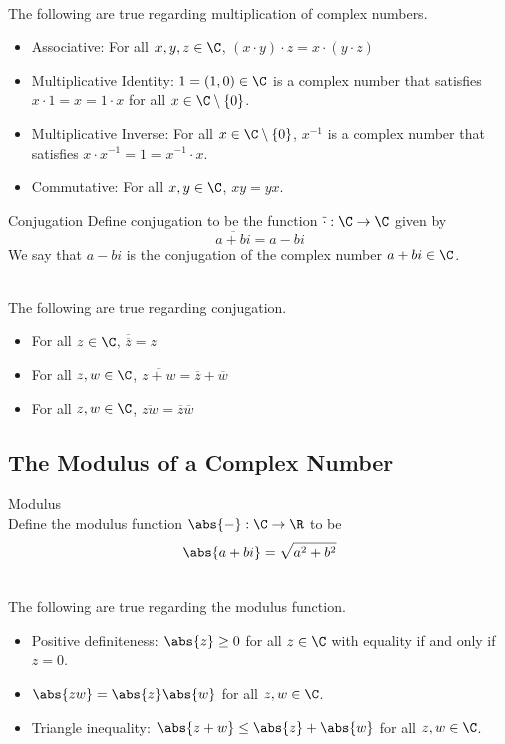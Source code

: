 \documentclass[a4paper]{article}
\begin{document}
\begin{prp}{}{}\\
The following are true regarding multiplication of complex numbers. 
\begin{itemize}
\item Associative: For all $x,y,z\in\C$, $(x\cdot y)\cdot z=x\cdot(y\cdot z)$
\item Multiplicative Identity: $1=(1,0)\in\C$ is a complex number that satisfies $x\cdot 1=x=1\cdot x$ for all $x\in\C\setminus\{0\}$. 
\item Multiplicative Inverse: For all $x\in\C\setminus\{0\}$, $x^{-1}$ is a complex number that satisfies $x\cdot x^{-1}=1=x^{-1}\cdot x$. 
\item Commutative: For all $x,y\in\C$, $xy=yx$. 
\end{itemize}
\end{prp}

\begin{defn}{Conjugation}{} Define conjugation to be the function $\overline{\cdot}:\C\to\C$ given by $$\overline{a+bi}=a-bi$$ We say that $a-bi$ is the conjugation of the complex number $a+bi\in\C$. 
\end{defn}

\begin{prp}{}{}\\
The following are true regarding conjugation. 
\begin{itemize}
\item For all $z\in\C$, $\overline{\overline{z}}=z$
\item For all $z,w\in\C$, $\overline{z+w}=\overline{z}+\overline{w}$
\item For all $z,w\in\C$, $\overline{zw}=\overline{z}\overline{w}$
\end{itemize}
\end{prp}

\subsection{The Modulus of a Complex Number}
\begin{defn}{Modulus}{}\\
Define the modulus function $\abs{-}:\C\to\R$ to be $$\abs{a+bi}=\sqrt{a^2+b^2}$$
\end{defn}

\begin{lmm}{}{}\\
The following are true regarding the modulus function. 
\begin{itemize}
\item Positive definiteness: $\abs{z}\geq 0$ for all $z\in\C$ with equality if and only if $z=0$. 
\item $\abs{zw}=\abs{z}\abs{w}$ for all $z,w\in\C$. 
\item Triangle inequality: $\abs{z+w}\leq\abs{z}+\abs{w}$ for all $z,w\in\C$. 
\end{itemize}
\end{lmm}
\end{document}
